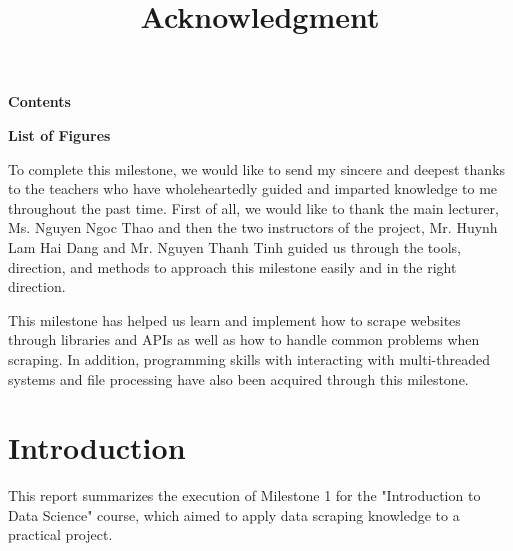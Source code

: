 \documentclass[12pt]{article}
\begin{document}

\renewcommand{\contentsname}{} %
\begin{center}
    \Large\textbf{Contents}
\end{center}

\renewcommand{\cftsecleader}{\cftdotfill{\cftdotsep}} %

\tableofcontents
\thispagestyle{empty}
\newpage


\renewcommand{\listfigurename}{} %
\begin{center}
    \Large\textbf{List of Figures}
\end{center}

\renewcommand{\cftfigleader}{\cftdotfill{\cftdotsep}} %
\listoffigures

\thispagestyle{empty}
\newpage
\title{Acknowledgment}
\author{}
\date{}
\maketitle
To complete this milestone, we would like to send my sincere and deepest thanks to the teachers who have wholeheartedly guided and imparted knowledge to me throughout the past time. First of all, we would like to thank the main lecturer, Ms. Nguyen Ngoc Thao and then the two instructors of the project, Mr. Huynh Lam Hai Dang and Mr. Nguyen Thanh Tinh guided us through the tools, direction, and methods to approach this milestone easily and in the right direction.


This milestone has helped us learn and implement how to scrape websites through libraries and APIs as well as how to handle common problems when scraping. In addition, programming skills with interacting with multi-threaded systems and file processing have also been acquired through this milestone.
\newpage
\section{Introduction}
This report summarizes the execution of Milestone 1 for the "Introduction to Data Science" course, which aimed to apply data scraping knowledge to a practical project.
\end{document}
